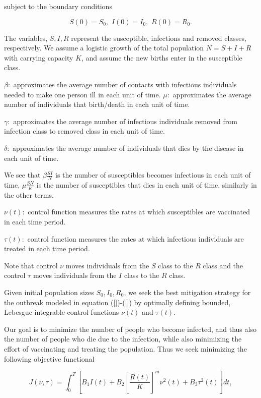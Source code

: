 subject to the boundary conditions

\begin{equation}\label{eq.1.4.4}
S(0)=S_0,\,\, I(0)=I_0,\,\, R(0)=R_0.
\end{equation}

The variables,  $S,I, R$ represent the susceptible, infections and removed classes, respectively. We assume a logistic growth of the total population $N=S+I+R$ with carrying capacity $K$, and assume the new births enter in the susceptible class.

$\beta :$ approximates the average number of contacts with infectious individuals needed to make one person ill in each unit of time.
$\mu :$ approximates the average number of individuals that birth/death in each unit of time.

$\gamma :$ approximates the average number of infectious individuals removed from infection class to removed class in each unit of time.

$\delta :$ approximates the average number of individuals that dies by the disease in each unit of time.

We see that $\beta \frac{SI}{N}$ is the number of susceptibles becomes infectious in each unit of time, $\mu \frac{SN}{K}$ is the number of susceptibles that dies in each unit of time, similarly in the other terms. 

$\nu (t):$ control function measures the rates at which susceptibles are vaccinated in each time period.

$\tau (t):$ control function measures the rates at which infectious individuals are treated in each time period.

Note that control $\nu$ moves individuals from the $S$ class to the $R$ class and the control $\tau$ moves individuals from the $I$ class to the $R$ class.

Given initial population sizes $S_0,I_0,R_0$, we seek the best mitigation strategy for the outbreak modeled in equation (\ref{})-(\ref{}) by optimally defining bounded, Lebesgue integrable control functions $\nu (t)$ and $\tau (t)$.

Our goal is to minimize the number of people who become infected, and thus also the number of people who die due to the infection, while also minimizing the effort of vaccinating and treating the population. Thus we seek minimizing the following objective functional

\begin{equation}\label{eq.1.4.5}
J(\nu,\tau)=\int_{0}^{T} [B_1 I(t)+B_2[\frac{R(t)}{K}]^m \nu^2(t)+B_3\tau^2(t)] dt,
\end{equation}

